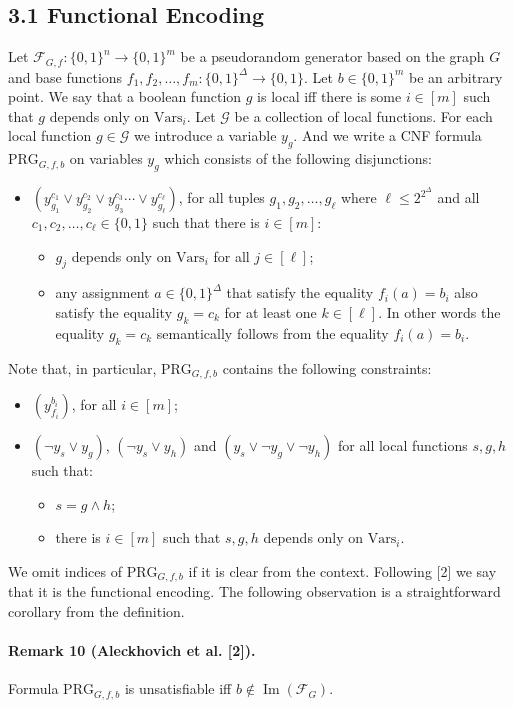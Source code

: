 \documentclass[10pt,a4paper]{article}
\begin{document}
\subsection*{3.1 Functional Encoding}
Let $\mathcal F_{G,f}:\{0,1\}^n\to\{0,1\}^m$ be a pseudorandom generator based on the graph $G$ and base functions $f_1,f_2,\ldots,f_m:\{0,1\}^\Delta\to\{0,1\}$. Let $b\in\{0,1\}^m$ be an arbitrary point. We say that a boolean function $g$ is local iff there is some $i\in[m]$ such that $g$ depends only on $\mathrm{Vars}_i$. Let $\mathcal G$ be a collection of local functions.
For each local function $g\in\mathcal G$ we introduce a variable $y_g$. And we write a CNF formula $\mathrm{PRG}_{G,f,b}$ on variables $y_g$ which consists of the following disjunctions:
\begin{itemize}
\item $(y_{g_1}^{c_1}\vee y_{g_2}^{c_2}\vee y_{g_3}^{c_3}\cdots\vee y_{g_\ell}^{c_\ell})$, for all tuples $g_1,g_2,\ldots,g_\ell$ where $\ell\leq2^{2^\Delta}$ and all $c_1,c_2,\ldots,c_\ell\in\{0,1\}$ such that there is $i\in[m]$:
\begin{itemize}
\item $g_j$ depends only on $\mathrm{Vars}_i$ for all $j\in[\ell]$;
\item any assignment $a\in\{0,1\}^\Delta$ that satisfy the equality $f_i(a)=b_i$ also satisfy the equality $g_k=c_k$ for at least one $k\in[\ell]$. In other words the equality $g_k=c_k$ semantically follows from the equality $f_i(a)=b_i$.
\end{itemize}
\end{itemize}
Note that, in particular, $\mathrm{PRG}_{G,f,b}$ contains the following constraints:
\begin{itemize}
\item $(y_{f_i}^{b_i})$, for all $i\in[m]$;
\item $(\neg y_s\vee y_g)$, $(\neg y_s\vee y_h)$ and $(y_s\vee\neg y_g\vee\neg y_h)$ for all local functions $s,g,h$ such that:
\begin{itemize}
\item $s=g\wedge h$;
\item there is $i\in[m]$ such that $s,g,h$ depends only on $\mathrm{Vars}_i$.
\end{itemize}
\end{itemize}
We omit indices of $\mathrm{PRG}_{G,f,b}$ if it is clear from the context. Following [2] we say that it is the functional encoding. The following observation is a straightforward corollary from the definition.
\paragraph{Remark 10 (Aleckhovich et al. [2]).} Formula $\mathrm{PRG}_{G,f,b}$ is unsatisfiable iff $b\notin\operatorname{Im}(\mathcal F_G)$.
\end{document}
